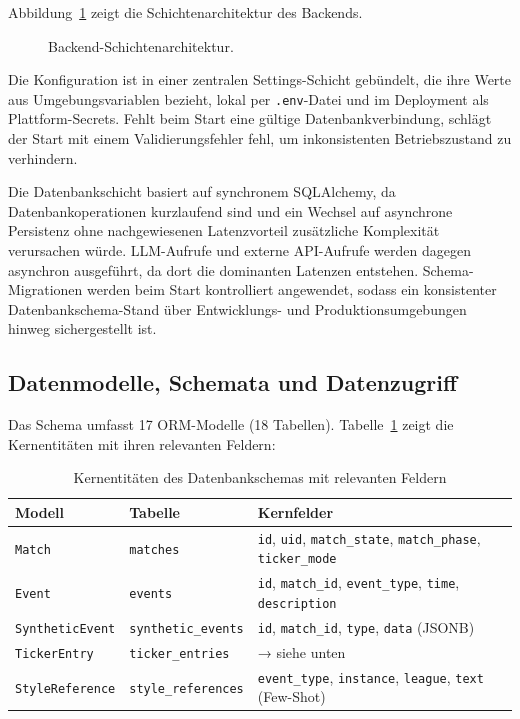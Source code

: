 Abbildung~\ref{fig:backend-schichten} zeigt die Schichtenarchitektur des Backends.

\begin{figure}[H]
\centering
\DiagramBackendSchichten
\caption[Schichtenarchitektur des FastAPI-Backends]{Backend-Schichtenarchitektur.}
\label{fig:backend-schichten}
\end{figure}

Die Konfiguration ist in einer zentralen Settings-Schicht gebündelt, die ihre Werte aus Umgebungsvariablen bezieht, lokal per \texttt{.env}-Datei und im Deployment als Plattform-Secrets. Fehlt beim Start eine gültige Datenbankverbindung, schlägt der Start mit einem Validierungsfehler fehl, um inkonsistenten Betriebszustand zu verhindern.

Die Datenbankschicht basiert auf synchronem SQLAlchemy, da Datenbankoperationen kurzlaufend sind und ein Wechsel auf asynchrone Persistenz ohne nachgewiesenen Latenzvorteil zusätzliche Komplexität verursachen würde. LLM-Aufrufe und externe API-Aufrufe werden dagegen asynchron ausgeführt, da dort die dominanten Latenzen entstehen. Schema-Migrationen werden beim Start kontrolliert angewendet, sodass ein konsistenter Datenbankschema-Stand über Entwicklungs- und Produktionsumgebungen hinweg sichergestellt ist.

\subsection{Datenmodelle, Schemata und Datenzugriff}\label{datenmodelle-datenbankschema-und-api-validierung}

Das Schema umfasst 17 ORM-Modelle (18 Tabellen). Tabelle~\ref{tab:kernentitaeten} zeigt die Kernentitäten mit ihren relevanten Feldern:

{\small\begin{longtable}[]{@{}
  >{\raggedright\arraybackslash}p{}
  >{\raggedright\arraybackslash}p{}
  >{\raggedright\arraybackslash}p{}@{}}
\caption{Kernentitäten des Datenbankschemas mit relevanten Feldern}\label{tab:kernentitaeten}\\
\toprule\noalign{}
Modell & Tabelle & Kernfelder \\
\midrule\noalign{}
\endhead
\bottomrule\noalign{}
\endlastfoot
\texttt{Match} & \texttt{matches} & \texttt{id}, \texttt{uid},
\texttt{match\_state}, \texttt{match\_phase}, \texttt{ticker\_mode} \\
\texttt{Event} & \texttt{events} & \texttt{id}, \texttt{match\_id},
\texttt{event\_type}, \texttt{time}, \texttt{description} \\
\texttt{SyntheticEvent} & \texttt{synthetic\_events} & \texttt{id},
\texttt{match\_id}, \texttt{type}, \texttt{data} (JSONB) \\
\texttt{TickerEntry} & \texttt{ticker\_entries} & → siehe unten \\
\texttt{StyleReference} & \texttt{style\_references} &
\texttt{event\_type}, \texttt{instance}, \texttt{league}, \texttt{text}
(Few-Shot) \\
\end{longtable}
}

